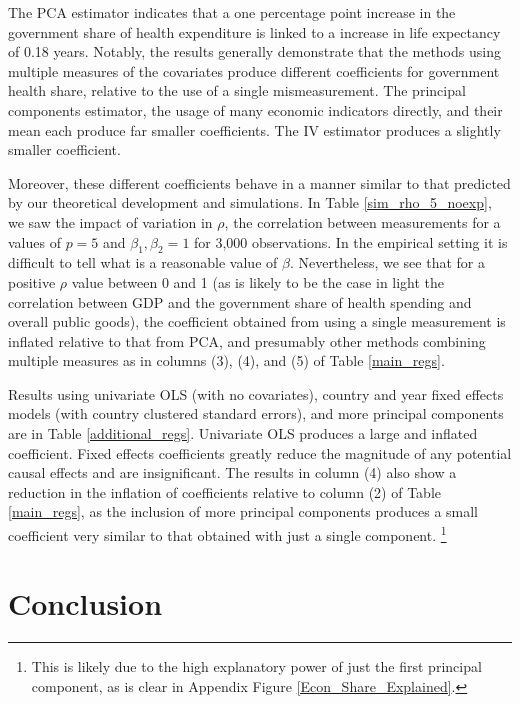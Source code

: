 \documentclass[10pt]{article}
\begin{document}
        

        The PCA estimator indicates that a one percentage point increase in the government share of health expenditure is linked to a increase in life expectancy of 0.18 years. Notably, the results generally demonstrate that the methods using multiple measures of the covariates produce different coefficients for government health share, relative to the use of a single mismeasurement. The principal components estimator, the usage of many economic indicators directly, and their mean each produce far smaller coefficients. The IV estimator produces a slightly smaller coefficient.

        Moreover, these different coefficients behave in a manner similar to that predicted by our theoretical development and simulations. In Table \ref{sim_rho_5_noexp}, we saw the impact of variation in $\rho$, the correlation between measurements for a values of $p = 5$ and $\beta_1, \beta_2 = 1$ for 3,000 observations. In the empirical setting it is difficult to tell what is a reasonable value of $\beta$. Nevertheless, we see that for a positive $\rho$ value between 0 and 1 (as is likely to be the case in light the correlation between GDP and the government share of health spending and overall public goods), the coefficient obtained from using a single measurement is inflated relative to that from PCA, and presumably other methods combining multiple measures as in columns (3), (4), and (5) of Table \ref{main_regs}.

        Results using univariate OLS (with no covariates), country and year fixed effects models (with country clustered standard errors), and more principal components are in Table \ref{additional_regs}. Univariate OLS produces a large and inflated coefficient. Fixed effects coefficients greatly reduce the magnitude of any potential causal effects and are insignificant. The results in column (4) also show a reduction in the inflation of coefficients relative to column (2) of Table \ref{main_regs}, as the inclusion of more principal components produces a small coefficient very similar to that obtained with just a single component. \footnote{This is likely due to the high explanatory power of just the first principal component, as is clear in Appendix Figure \ref{Econ_Share_Explained}.}

        

    \section*{Conclusion}
        
\end{document}
